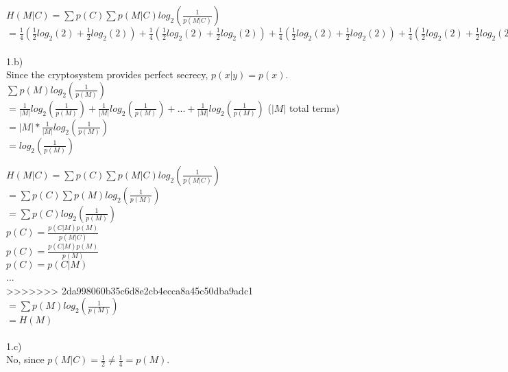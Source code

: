 \documentclass{assignment}
\begin{document}
\begin{problemlist}
\begin{problem}
\begin{answer}
$H(M|C)=\sum p(C)\sum p(M|C)log_2(\frac{1}{p(M|C)})$\\
$=\frac{1}{4}(\frac{1}{2}log_2(2) + \frac{1}{2}log_2(2)) + \frac{1}{4}(\frac{1}{2}log_2(2) + \frac{1}{2}log_2(2)) + \frac{1}{4}(\frac{1}{2}log_2(2) + \frac{1}{2}log_2(2)) + \frac{1}{4}(\frac{1}{2}log_2(2) + \frac{1}{2}log_2(2))$\\
\\
1.b)\\
Since the cryptosystem provides perfect secrecy, $p(x|y)=p(x)$.\\
$\sum p(M)log_2(\frac{1}{p(M)})$\\
$=\frac{1}{|M|}log_2(\frac{1}{p(M)})+\frac{1}{|M|}log_2(\frac{1}{p(M)})+...+\frac{1}{|M|}log_2(\frac{1}{p(M)})$  ($|M|$ total terms)\\
$=|M|*\frac{1}{|M|}log_2(\frac{1}{p(M)})$ \\
$=log_2(\frac{1}{p(M)})$ 

$H(M|C)=\sum p(C)\sum p(M|C)log_2(\frac{1}{p(M|C)})$\\
$=\sum p(C)\sum p(M)log_2(\frac{1}{p(M)})$\\
$=\sum p(C)log_2(\frac{1}{p(M)})$\\

$p(C)=\frac{p(C|M)p(M)}{p(M|C)}$\\
$p(C)=\frac{p(C|M)p(M)}{p(M)}$\\
$p(C)=p(C|M)$\\
...\\
>>>>>>> 2da998060b35c6d8e2cb4ecca8a45c50dba9adc1
$=\sum p(M)log_2(\frac{1}{p(M)})$\\
$=H(M)$\\
\\
1.c)\\
No, since $p(M|C)=\frac{1}{2}\neq\frac{1}{4}=p(M)$.\\
\\
\end{answer}
\end{problem}


\end{problemlist}
\end{document}
